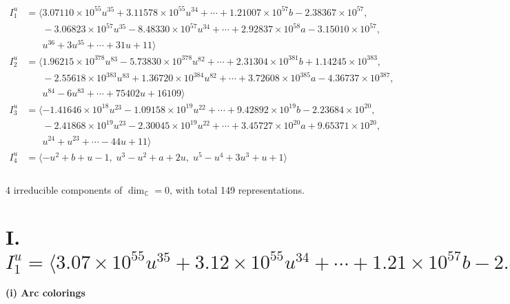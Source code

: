 \documentclass[1p]{elsarticle_modified}
\theoremstyle{definition}
\begin{document}
\begin{align*}
I^u_{1}&=\langle 
3.07110\times10^{55} u^{35}+3.11578\times10^{55} u^{34}+\cdots+1.21007\times10^{57} b-2.38367\times10^{57},\\
\phantom{I^u_{1}}&\phantom{= \langle  }-3.06823\times10^{57} u^{35}-8.48330\times10^{57} u^{34}+\cdots+2.92837\times10^{58} a-3.15010\times10^{57},\\
\phantom{I^u_{1}}&\phantom{= \langle  }u^{36}+3 u^{35}+\cdots+31 u+11\rangle \\
I^u_{2}&=\langle 
1.96215\times10^{378} u^{83}-5.73830\times10^{378} u^{82}+\cdots+2.31304\times10^{381} b+1.14245\times10^{383},\\
\phantom{I^u_{2}}&\phantom{= \langle  }-2.55618\times10^{383} u^{83}+1.36720\times10^{384} u^{82}+\cdots+3.72608\times10^{385} a-4.36737\times10^{387},\\
\phantom{I^u_{2}}&\phantom{= \langle  }u^{84}-6 u^{83}+\cdots+75402 u+16109\rangle \\
I^u_{3}&=\langle 
-1.41646\times10^{18} u^{23}-1.09158\times10^{19} u^{22}+\cdots+9.42892\times10^{19} b-2.23684\times10^{20},\\
\phantom{I^u_{3}}&\phantom{= \langle  }-2.41868\times10^{19} u^{23}-2.30045\times10^{19} u^{22}+\cdots+3.45727\times10^{20} a+9.65371\times10^{20},\\
\phantom{I^u_{3}}&\phantom{= \langle  }u^{24}+u^{23}+\cdots-44 u+11\rangle \\
I^u_{4}&=\langle 
- u^2+b+u-1,\;u^3- u^2+a+2 u,\;u^5- u^4+3 u^3+u+1\rangle \\
\\
\end{align*}
\raggedright * 4 irreducible components of $\dim_{\mathbb{C}}=0$, with total 149 representations.\\
\newpage
\renewcommand{\arraystretch}{1}
\centering \section*{I. $I^u_{1}= \langle 3.07\times10^{55} u^{35}+3.12\times10^{55} u^{34}+\cdots+1.21\times10^{57} b-2.38\times10^{57},\;-3.07\times10^{57} u^{35}-8.48\times10^{57} u^{34}+\cdots+2.93\times10^{58} a-3.15\times10^{57},\;u^{36}+3 u^{35}+\cdots+31 u+11 \rangle$}
\flushleft \textbf{(i) Arc colorings}\\
\end{document}
